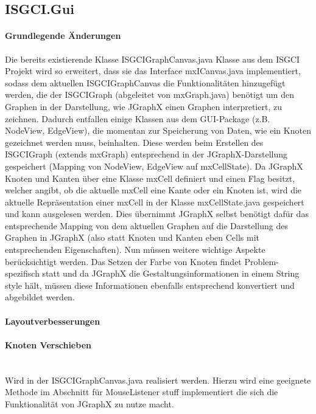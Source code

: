 \documentclass[10pt,a4paper]{article}
\begin{document}
\subsection{ISGCI.Gui}
\paragraph{Grundlegende Änderungen}
Die bereits existierende Klasse ISGCIGraphCanvas.java Klasse aus dem ISGCI Projekt wird so erweitert, dass sie das Interface mxICanvas.java implementiert, sodass dem aktuellen ISGCIGraphCanvas die Funktionalitäten hinzugefügt werden, die der ISGCIGraph (abgeleitet von mxGraph.java) benötigt um den Graphen in der Darstellung, wie JGraphX einen Graphen interpretiert, zu zeichnen. Dadurch entfallen einige Klassen aus dem GUI-Package (z.B. NodeView, EdgeView), die momentan zur Speicherung von Daten, wie ein Knoten gezeichnet werden muss, beinhalten. Diese werden beim Erstellen des ISGCIGraph (extends mxGraph) entsprechend in der JGraphX-Darstellung gespeichert (Mapping von NodeView, EdgeView auf mxCellState). Da JGraphX Knoten und Kanten über eine Klasse mxCell definiert und einen Flag besitzt, welcher angibt, ob die aktuelle mxCell eine Kante oder ein Knoten ist, wird die aktuelle Repräsentation einer mxCell in der Klasse mxCellState.java gespeichert und kann ausgelesen werden. Dies übernimmt JGraphX selbst benötigt dafür das entsprechende Mapping von dem aktuellen Graphen auf die Darstellung des Graphen in JGraphX (also statt Knoten und Kanten eben Cells mit entsprechenden Eigenschaften). Nun müssen weitere wichtige Aspekte berücksichtigt werden. Das Setzen der Farbe von Knoten findet Problem-spezifisch statt und da JGraphX die Gestaltungsinformationen in einem String style hält, müssen diese Informationen ebenfalls entsprechend konvertiert und abgebildet werden.
\paragraph{Layoutverbesserungen}

\paragraph{Knoten Verschieben}\ \\ 

Wird in der ISGCIGraphCanvas.java realisiert werden. Hierzu wird eine geeignete Methode im Abschnitt für MouseListener stuff implementiert die sich die Funktionalität von JGraphX zu nutze macht.
\end{document}
